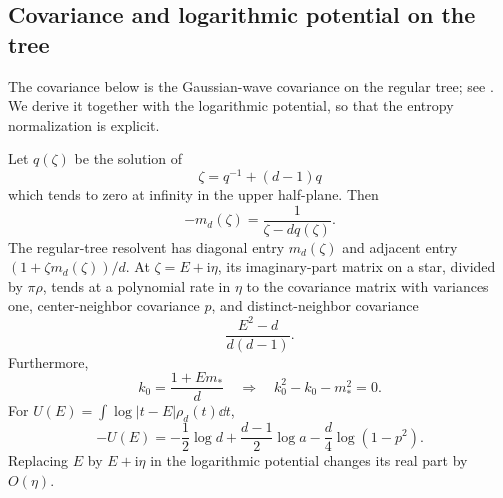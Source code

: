 \subsection{Covariance and logarithmic potential on the tree}

The covariance below is the Gaussian-wave covariance on the regular
tree; see \cite{ElonEigenvectors,CsokaEtAl}. We derive it together with
the logarithmic potential, so that the entropy normalization is explicit.

\begin{lemma}\label{lem:tree-identities}
Let \(q(\zeta)\) be the solution of
\[
 \zeta=q^{-1}+(d-1)q
\]
which tends to zero at infinity in the upper half-plane.
Then
\[
 -m_d(\zeta)=\frac1{\zeta-dq(\zeta)}.
\]
The regular-tree resolvent has diagonal entry \(m_d(\zeta)\) and
adjacent entry \((1+\zeta m_d(\zeta))/d\).
At \(\zeta=E+\mathrm i\eta\), its imaginary-part matrix on a star,
divided by \(\pi\rho\), tends at a polynomial rate in \(\eta\) to the
covariance matrix with variances one, center-neighbor covariance \(p\),
and distinct-neighbor covariance
\[
 \frac{E^2-d}{d(d-1)}.
\]
Furthermore,
\[
 k_0=\frac{1+Em_*}{d}
 \quad\Longrightarrow\quad
 k_0^2-k_0-m_*^2=0.
\]
For \(U(E)=\int\log|t-E|\rho_d(t)\dd t\),
\begin{equation}\label{eq:tree-potential}
 -U(E)=-\frac12\log d+\frac{d-1}{2}\log a
                       -\frac d4\log(1-p^2).
\end{equation}
Replacing \(E\) by \(E+\mathrm i\eta\) in the logarithmic potential
changes its real part by \(O(\eta)\).
\end{lemma}

